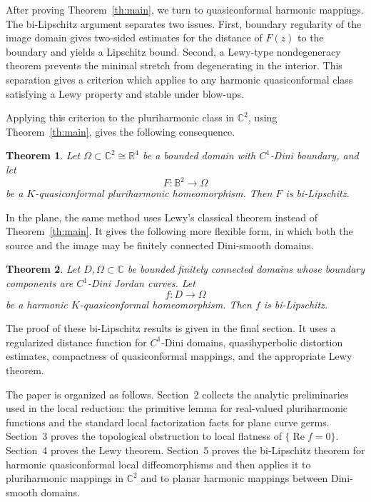 \documentclass[11pt]{amsart}
\newtheorem{theorem}{Theorem}
\theoremstyle{definition}
\theoremstyle{remark}
\newcommand{\C}{\mathbb C}
\newcommand{\R}{\mathbb R}
\begin{document}
After proving Theorem~\ref{th:main}, we turn to quasiconformal
harmonic mappings. The bi-Lipschitz argument separates two issues.
First, boundary regularity of the image domain gives two-sided estimates
for the distance of \(F(z)\) to the boundary and yields a Lipschitz
bound. Second, a Lewy-type nondegeneracy theorem prevents the minimal
stretch from degenerating in the interior. This separation gives a
criterion which applies to any harmonic quasiconformal class satisfying
a Lewy property and stable under blow-ups.

Applying this criterion to the pluriharmonic class in \(\C^2\), using
Theorem~\ref{th:main}, gives the following consequence.

\begin{theorem}\label{th:intro-bilip}
Let \(\Omega\subset\C^2\cong\R^4\) be a bounded domain with
\(C^1\)-Dini boundary, and let
\[
        F:\mathbb B^2\to\Omega
\]
be a \(K\)-quasiconformal pluriharmonic homeomorphism. Then \(F\) is
bi-Lipschitz.
\end{theorem}

In the plane, the same method uses Lewy's classical theorem instead of
Theorem~\ref{th:main}. It gives the following more flexible form, in
which both the source and the image may be finitely connected Dini-smooth
domains.

\begin{theorem}\label{th:intro-planar-bilip}
Let \(D,\Omega\subset\C\) be bounded finitely connected domains whose
boundary components are \(C^1\)-Dini Jordan curves. Let
\[
        f:D\to\Omega
\]
be a harmonic \(K\)-quasiconformal homeomorphism. Then \(f\) is
bi-Lipschitz.
\end{theorem}

The proof of these bi-Lipschitz results is given in the final section.
It uses a regularized distance function for \(C^1\)-Dini domains,
quasihyperbolic distortion estimates, compactness of quasiconformal
mappings, and the appropriate Lewy theorem.

The paper is organized as follows. Section~2 collects the analytic
preliminaries used in the local reduction: the primitive lemma for
real-valued pluriharmonic functions and the standard local factorization
facts for plane curve germs. Section~3 proves the topological obstruction to
local flatness of \(\{\operatorname{Re} f=0\}\). Section~4 proves the
Lewy theorem. Section~5 proves the bi-Lipschitz theorem for harmonic
quasiconformal local diffeomorphisms and then applies it to pluriharmonic
mappings in \(\C^2\) and to planar harmonic mappings between Dini-smooth
domains.
\end{document}
